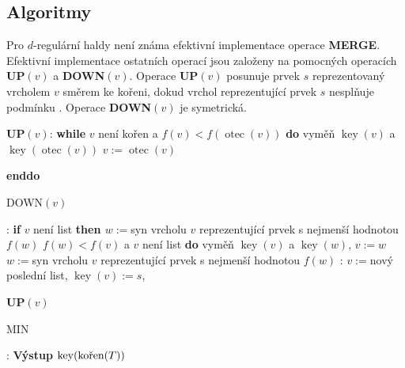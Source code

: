 \documentclass[a4paper,12pt]{article}
\DeclareMathOperator*{\otec}{otec}
\DeclareMathOperator*{\key}{key}
\begin{document}
\subsection{
Algoritmy
}

Pro $d$-regulární haldy není známa efektivní implementace operace 
{\bf MERGE}.  Efektivní implementace 
ostatních operací jsou založeny na pomocných 
operacích {\bf UP$(v)$} a {\bf DOWN$(v)$}.  Ope\-race {\bf UP$
(v)$} posunuje 
prvek $s$ reprezentovaný vrcholem $v$ směrem ke kořeni, 
dokud vrchol reprezentující prvek $s$ nesplňu\-je podmínku 
.  Operace {\bf DOWN$(v)$} je symetrická.  

 

{\bf UP$(v)$}:\newline 
{\bf while} $v$ není kořen a $f(v)<f(\otec(v))$ {\bf do\newline 
\phantom{{\rm ---}}}vyměň $\key(v)$ a $\key(\otec(v))$\newline 
\phantom{---}$v:=\otec(v)$\newline 
{\bf enddo

DOWN$(v)$}:\newline 
{\bf if} $v$ není list {\bf then\newline 
\phantom{{{\rm ---}}}$w:=$}syn vrcholu $v$ reprezentující prvek s nejmenší 
hodnotou $f(w)$\newline 
\phantom{---}{\bf while} $f(w)<f(v)$ a $v$ není list {\bf do\newline 
\phantom{{\rm ------}}}vyměň $\key(v)$ a $\key(w)$, $v:=w$\newline 
\phantom{------}$w:=$syn vrcholu $v$ reprezentující prvek s nejmenší 
hodnotou $f(w)$\newline 
\phantom{---}{\bf enddo\newline 
endif

INSERT$(s)$}:\newline 
$v:=$nový poslední list, $\key(v):=s$, {\bf UP$(v)$

MIN}:\newline 
{\bf Výstup} $\key(\text{\rm kořen}(T))$
\end{document}
